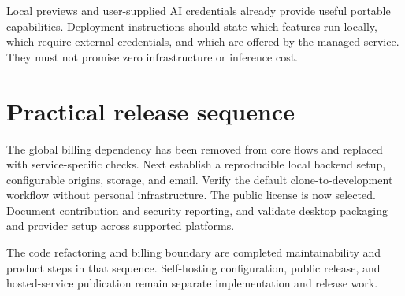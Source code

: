 \documentclass[11pt,a4paper]{article}
\begin{document}
Local previews and user-supplied AI credentials already provide useful portable
capabilities. Deployment instructions should state which features run locally,
which require external credentials, and which are offered by the managed
service. They must not promise zero infrastructure or inference cost.

\section{Practical release sequence}
The global billing dependency has been removed from core flows and replaced
with service-specific checks. Next establish a reproducible local backend
setup, configurable origins, storage, and email. Verify the default
clone-to-development workflow without personal infrastructure. The public
license is now selected. Document contribution and security reporting, and
validate desktop packaging and provider setup across supported platforms.

The code refactoring and billing boundary are completed maintainability and
product steps in that sequence. Self-hosting configuration, public release,
and hosted-service publication remain separate implementation and release work.
\end{document}
